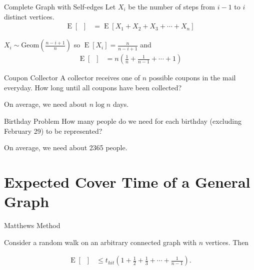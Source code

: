 \documentclass[12pt]{beamer}
\DeclareMathOperator{\E}{\textrm{E}}		     %
\DeclareMathOperator{\cov}{t_{cov}}	             %
\begin{document}
\begin{frame}{Complete Graph with Self-edges}
Let $X_i$ be the number of steps from $i-1$ to $i$ distinct vertices.
 {
\begin{align}
\E[\cov] &= \E[X_1+X_2+X_3+\cdots+X_{n}] \nonumber
\end{align}
}

 {$X_i \sim \textrm{Geom}(\frac{n-i+1}{n})$}
 {so $\E[X_i] = \frac{n}{n-i+1}$}
 {and
\begin{align}
\E[\cov] &= n\left(\frac{1}{n}+\frac{1}{n-1}+\cdots+1\right) \nonumber
\end{align}
}
\end{frame}

\begin{frame}{Coupon Collector}
\centering
A collector receives one of $n$ possible coupons in the mail everyday.
How long until all coupons have been collected?
\bigskip

On average, we need about $n \log n$ days.
\end{frame}

\begin{frame}{Birthday Problem}
\centering
How many people do we need for each birthday (excluding February 29)
to be represented?
\bigskip

On average, we need about 2365 people.
\end{frame}

\section{Expected Cover Time of a General Graph}

\begin{frame}{Matthews Method}
\begin{theorem}
Consider a random walk on an arbitrary connected graph with $n$ vertices. Then
\end{theorem}
\begin{align}
\E[\cov] &\leq t_{hit} \left(1 + \frac{1}{2} + \frac{1}{3} + \cdots + \frac{1}{n-1} \right). \nonumber
\end{align}
\end{frame}
\end{document}
